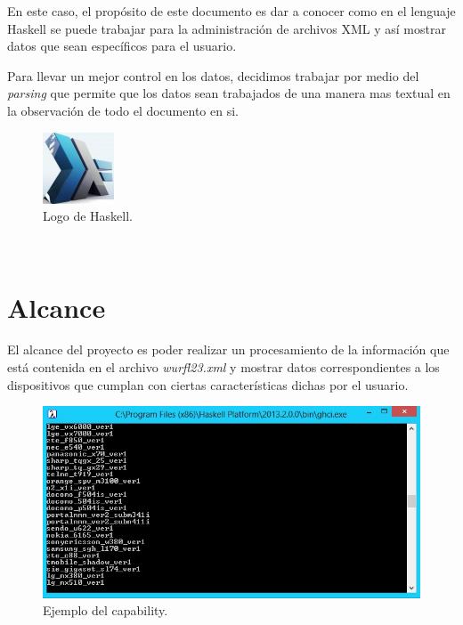 \documentclass[12pt]{book} %
\begin{document}
En este caso, el prop\'osito de este documento es dar a conocer como en el lenguaje Haskell se puede trabajar para la administraci\'on de archivos XML y as\'i mostrar datos que sean espec\'ificos para el usuario. 

Para llevar un mejor control en los datos, decidimos trabajar por medio del \textit{parsing} que permite que los datos sean trabajados de una manera mas textual en la observaci\'on de todo el documento en si.

\begin{figure}[h!]
        \begin{center}
        \includegraphics[scale=0.5]{logo.jpeg}
        \end{center}
        \caption{Logo de Haskell.}
\end{figure}~\\[2cm]



\chapter{Alcance}
El alcance del proyecto es poder realizar un procesamiento de la informaci\'on que est\'a contenida en el archivo \textit{wurfl23.xml} y mostrar datos correspondientes a los dispositivos que cumplan con ciertas caracter\'isticas dichas por el usuario.

\begin{figure}[h!]
        \begin{center}
        \includegraphics[scale=0.9]{ejemplo.jpg}
        \end{center}
        \caption{Ejemplo del capability.}
\end{figure}~\\[2cm]
\end{document}
